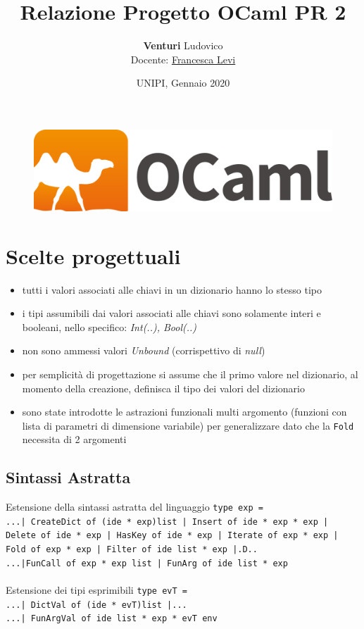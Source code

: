 \documentclass[10pt, a4paper]{article}
\title{\textbf{Relazione Progetto OCaml PR 2}}
\author{\textbf{Venturi} Ludovico\\Docente: \href{http://pages.di.unipi.it/levi/}{Francesca Levi}}
\date{UNIPI, Gennaio 2020}
\begin{document}
\maketitle
\tableofcontents
\vfill
\begin{figure}[h]
	\centering
	\includegraphics[scale=0.3]{ocaml_logo}
	\label{fig:0}
\end{figure}

\clearpage

\section{Scelte progettuali}
\begin{itemize}
\item tutti i valori associati alle chiavi in un dizionario hanno lo stesso tipo
\item i tipi assumibili dai valori associati alle chiavi sono solamente interi e booleani, nello specifico: \textit{Int(..), Bool(..)}
\item non sono ammessi valori \textit{Unbound} (corrispettivo di \textit{null})
\item per semplicità di progettazione si assume che il primo valore nel dizionario, al momento della creazione, definisca il tipo dei valori del dizionario
\item sono state introdotte le astrazioni funzionali multi argomento (funzioni con lista di parametri di dimensione variabile) per generalizzare dato che la \texttt{Fold} necessita di 2 argomenti
\end{itemize}
\subsection{Sintassi Astratta}
Estensione della sintassi astratta del linguaggio  \texttt{type exp = }\\
\texttt{...| CreateDict of (ide * exp)list | Insert of ide * exp * exp | Delete of  ide * exp | HasKey of ide * exp | Iterate of exp * exp	|
Fold of exp * exp | Filter of ide list * exp 	|.D..\\
...|FunCall of exp * exp list | FunArg of ide list * exp}\\\\
Estensione dei tipi esprimibili	\texttt{type evT = }\\
\texttt{...| DictVal of (ide * evT)list |...\\...| FunArgVal of ide list * exp * evT env }
\end{document}
